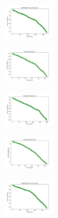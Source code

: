 \begin{figure}[H]
\begin{subfigure}
    \end{subfigure}
    \hfill
    \begin{subfigure}
        \centering
        \includegraphics[width=0.234\textwidth]{img/bl/newthyroid_set_const_10_277451237_cost.png}
    \end{subfigure}
    \hfill
    \begin{subfigure}
        \centering
        \includegraphics[width=0.234\textwidth]{img/bl/iris_set_const_10_49258669_cost.png}
    \end{subfigure}
    \hfill
    \begin{subfigure}
        \centering
        \includegraphics[width=0.234\textwidth]{img/bl/ecoli_set_const_10_49258669_cost.png}
    \end{subfigure}
    \hfill
    \begin{subfigure}
        \centering
        \includegraphics[width=0.234\textwidth]{img/bl/rand_set_const_10_49258669_cost.png}
    \end{subfigure}
    \hfill
    \begin{subfigure}
        \centering
        \includegraphics[width=0.234\textwidth]{img/bl/newthyroid_set_const_10_49258669_cost.png}
    \end{subfigure}
    \hfill
    \begin{subfigure}

\end{subfigure}
\end{figure}
